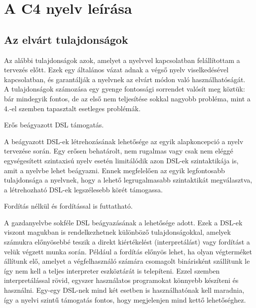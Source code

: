 \section{A C4 nyelv leírása}\label{sec:c4:desc}

\subsection{Az elvárt tulajdonságok}\label{subsec:c4:desc:prop}

Az alábbi tulajdonságok azok, amelyet a nyelvvel kapcsolatban felállítottam a tervezés előtt.
Ezek egy általános vázat adnak a végső nyelv viselkedésével kapcsolatban, és garantálják a nyelvnek az elvárt módon való használhatóságát.
A tulajdonságok számozása egy gyenge fontossági sorrendet valósít meg köztük: bár mindegyik fontos, de az első nem teljesítése sokkal nagyobb probléma, mint a 4.-el szemben tapasztalt esetleges problémák.

\begin{property}\label{prop:dsl-friendly}
    Erős beágyazott \gls{DSL} támogatás.

    A beágyazott \gls{DSL}-ek létrehozásának lehetősége az egyik alapkoncepció a nyelv tervezése során.
    Egy erősen behatárolt, nem rugalmas vagy csak nem eléggé egységesített szintaxisú nyelv esetén limitálódik azon \gls{DSL}-ek szintaktikája is, amit a nyelvbe lehet beágyazni.
    Ennek megfelelően az egyik legfontosabb tulajdonsága a nyelvnek, hogy a lehető legrugalmasabb szintaktikát megválasztva, a létrehozható \gls{DSL}-ek legszélesebb körét támogassa.
\end{property}

\begin{property}\label{prop:uncompiled}
    Fordítás nélkül és fordítással is futtatható.

    A gazdanyelvbe sokféle \gls{DSL} beágyazásának a lehetősége adott.
    Ezek a \gls{DSL}-ek viszont magukban is rendelkezhetnek különböző tulajdonságokkal, amelyek számukra előnyösebbé teszik a direkt kiértékelést (interpretálást) vagy fordítást a velük végzett munka során.
    Például a fordítás előnyös lehet, ha olyan végterméket állítunk elő, amelyet a végfelhasználó számára csomagolt binárisként szállítunk le így nem kell a teljes interpreter eszköztárát is telepíteni.
    Ezzel szemben interpretálással rövid, egyszer használatos programokat könnyebb készíteni és használni.
    Egy-egy \gls{DSL}-nek mind két esetben is használhatónak kell maradnia, így a nyelvi szintű támogatás fontos, hogy megjelenjen mind kettő lehetőséghez.
\end{property}

